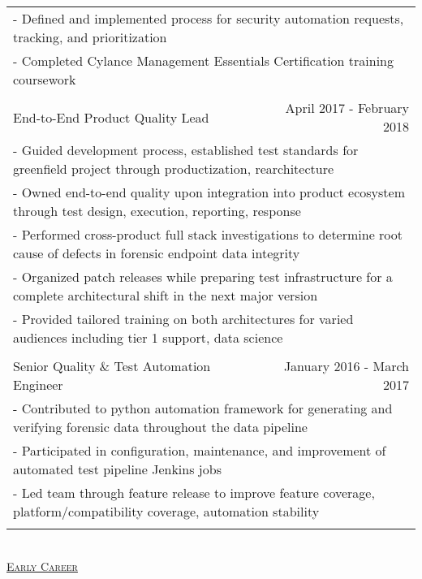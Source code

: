 \documentclass[letterpaper]{article}
\begin{document}
\begin{center}
\begin{tabular}{p{}p{}r}
			\\
				\multicolumn{3}{p{\textwidth}}{\quad\quad - Defined and implemented process for security automation requests, tracking, and prioritization}
			\\
				\multicolumn{3}{p{\textwidth}}{\quad\quad - Completed Cylance Management Essentials Certification training coursework}
			\\
			\\		%
				\multicolumn{2}{p{0.5\textwidth}}{\quad End-to-End Product Quality Lead}
				&
				{April 2017 - February 2018 \quad\quad\quad\quad}
			\\
				\multicolumn{3}{p{\textwidth}}{\quad\quad - Guided development process, established test standards for greenfield project through productization, rearchitecture} 
			\\
				\multicolumn{3}{p{\textwidth}}{\quad\quad - Owned end-to-end quality upon integration into product ecosystem through test design, execution, reporting, response} 
			\\
				\multicolumn{3}{p{\textwidth}}{\quad\quad - Performed cross-product full stack investigations to determine root cause of defects in forensic endpoint data integrity} 
			\\
				\multicolumn{3}{p{\textwidth}}{\quad\quad - Organized patch releases while preparing test infrastructure for a complete architectural shift in the next major version} 
			\\
				\multicolumn{3}{p{\textwidth}}{\quad\quad - Provided tailored training on both architectures for varied audiences including tier 1 support, data science}
			\\
			\\
				\multicolumn{2}{p{0.5\textwidth}}{\quad Senior Quality \& Test Automation Engineer}
				&
				{January 2016 - March 2017 \quad\quad\quad\quad}
			\\
				\multicolumn{3}{p{\textwidth}}{\quad\quad - Contributed to python automation framework for generating and verifying forensic data throughout the data pipeline} 
			\\
				\multicolumn{3}{p{\textwidth}}{\quad\quad - Participated in configuration, maintenance, and improvement of automated test pipeline Jenkins jobs}
			\\
				\multicolumn{3}{p{\textwidth}}{\quad\quad - Led team through feature release to improve feature coverage, platform/compatibility coverage, automation stability}  
			\\
			\\
		\end{tabular} \\
		\vspace{2.25in}
		\underline{\large \scshape Early Career}
		\begin{tabular}{p{}p{}r}
		\\
			

\end{tabular}
\end{center}
\end{document}
